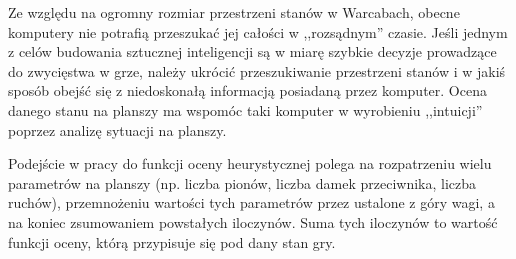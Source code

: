 Ze względu na ogromny rozmiar przestrzeni stanów w Warcabach, obecne komputery nie potrafią przeszukać jej całości w ,,rozsądnym'' czasie. Jeśli jednym z celów budowania sztucznej inteligencji są w miarę szybkie decyzje prowadzące do zwycięstwa w grze, należy ukrócić przeszukiwanie przestrzeni stanów i w jakiś sposób obejść się z niedoskonałą informacją posiadaną przez komputer. Ocena danego stanu na planszy ma wspomóc taki komputer w wyrobieniu ,,intuicji'' poprzez analizę sytuacji na planszy.

\FloatBarrier

Podejście w pracy do funkcji oceny heurystycznej polega na rozpatrzeniu wielu parametrów na planszy (np. liczba pionów, liczba damek przeciwnika, liczba ruchów), przemnożeniu wartości tych parametrów przez ustalone z góry wagi, a na koniec zsumowaniem powstałych iloczynów. Suma tych iloczynów to wartość funkcji oceny, którą przypisuje się pod dany stan gry.

